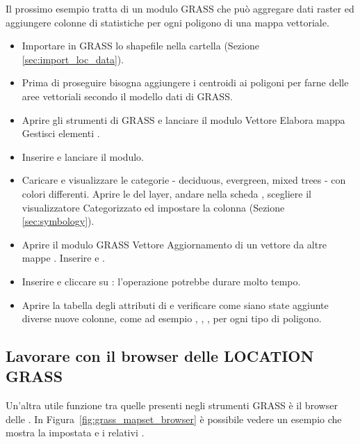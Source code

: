 Il prossimo esempio tratta di un modulo GRASS che può aggregare 
dati raster ed aggiungere colonne di statistiche per ogni poligono di una 
mappa vettoriale.

\begin{itemize}[label=--]
\item Importare in GRASS lo shapefile  nella cartella  
(Sezione \ref{sec:import_loc_data}).
\item Prima di proseguire bisogna aggiungere i centroidi ai poligoni 
per farne delle aree vettoriali secondo il modello dati di GRASS. 
\item Aprire gli strumenti di GRASS e lanciare il modulo 
Vettore \arrow Elabora mappa \arrow Gestisci elementi \arrow {}. 
\item Inserire 
e lanciare il modulo. 
\item Caricare  e visualizzare le categorie - deciduous, evergreen, mixed trees - 
con colori differenti. Aprire le  del layer, 
andare nella scheda , scegliere il visualizzatore Categorizzato
ed impostare la colonna  (Sezione \ref{sec:symbology}).
\item Aprire il modulo GRASS Vettore \arrow Aggiornamento di un vettore da altre mappe \arrow 
{}. Inserire  e . 
\item Inserire  e
cliccare su : l'operazione potrebbe durare molto tempo. 
\item Aprire la tabella degli attributi di  e verificare come 
siano state aggiunte diverse nuove colonne, come ad esempio ,
, , per ogni tipo di poligono.
\end{itemize}

\subsection{Lavorare con il browser delle LOCATION GRASS} 

Un'altra utile funzione tra quelle presenti negli strumenti GRASS è il browser
delle . In Figura~\ref{fig:grass_mapset_browser} è
possibile vedere un esempio che mostra la  impostata 
e i relativi .

